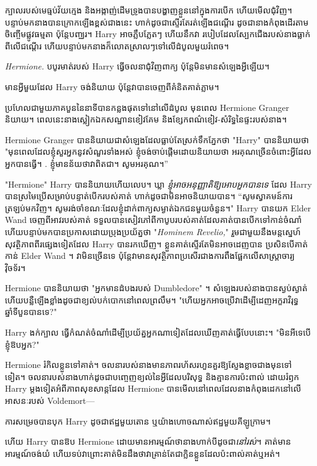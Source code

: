 ក្បាលរបស់មេធ្មប់វ័យក្មេង និងអង្កាញ់ដើមទ្រូងបានបង្ហាញខ្លួននៅក្នុងការបើក ហើយមើលជុំវិញ។ បន្ទាប់មកនាងបានក្រោកឡើងខ្ពស់ជាងនេះ ហាក់ដូចជាស្ទើរតែរត់ឡើងជណ្តើរ ដូចជានាងកំពុងដើរតាមចិញ្ចើមផ្លូវធម្មតា ប៉ុន្តែបញ្ឈរ។ Harry អាចភ្លឹបភ្លែតៗ ហើយនឹកវា របៀបដែលស្បែកជើងរបស់នាងធ្លាក់ពីលើជណ្ដើរ ហើយបន្ទាប់មកនាងក៏លោតស្រាលៗទៅលើដំបូលមួយរំពេច។

\emph{Hermione.} បបូរមាត់របស់ Harry ធ្វើចលនាជុំវិញពាក្យ ប៉ុន្តែមិនមានសំឡេងអ្វីឡើយ។

មាន​អ្វី​មួយ​ដែល Harry ចង់​និយាយ ប៉ុន្តែ​វា​បាន​ចេញ​ពី​គំនិត​គាត់​ភ្លាម។

ប្រហែលជាមួយភាគបួននៃនាទីបានកន្លងផុតទៅនៅលើដំបូល មុនពេល Hermione Granger និយាយ។ ពេលនេះនាងស្លៀកឯកសណ្ឋានខៀវគែម និងខ្សែកពណ៌ខៀវ-សំរិទ្ធនៃផ្ទះរបស់នាង។

Hermione Granger បាននិយាយជាសំឡេងដែលធ្លាប់តែស្រក់ទឹកភ្នែកថា "Harry" បាននិយាយថា "មុនពេលដែលខ្ញុំសួរអ្នកនូវសំណួរទាំងអស់ ខ្ញុំចង់ចាប់ផ្តើមដោយនិយាយថា អរគុណច្រើនចំពោះអ្វីដែលអ្នកបានធ្វើ។ . ខ្ញុំ​មាន​ន័យ​ថា​វា​ពិត​ជា​។ សូមអរគុណ។”

"Hermione" Harry បាននិយាយហើយលេប។ ឃ្លា \emph{ខ្ញុំអាចអនុញ្ញាតិឱ្យអោបអ្នកបានទេ} ដែល Harry បានស្រមៃប្រើសម្រាប់បន្ទាត់បើករបស់គាត់ ហាក់ដូចជាមិនអាចនិយាយបាន។ “សូមស្វាគមន៍ការត្រឡប់មកវិញ។ សូម​រង់ចាំ​ខណៈ​ដែល​ខ្ញុំ​ដាក់​ពាក្យ​សម្ងាត់​ឯកជន​មួយ​ចំនួន។" Harry បានយក Elder Wand ចេញពីអាវរបស់គាត់ ទទួលបានសៀវភៅពីកាបូបរបស់គាត់ដែលគាត់បានបើកទៅកាន់ចំណាំ ហើយបន្ទាប់មកបានប្រកាសដោយប្រុងប្រយ័ត្នថា "\emph{Hominem Revelio,}" រួមជាមួយនឹងមន្តស្នេហ៍សុវត្ថិភាពពីរផ្សេងទៀតដែល Harry បានរកឃើញ។ ខ្លួនគាត់ស្ទើរតែមិនអាចដេញបាន ប្រសិនបើគាត់កាន់ Elder Wand ។ វា​មិន​ច្រើន​ទេ ប៉ុន្តែ​វា​មាន​សុវត្ថិភាព​ប្រសើរ​ជាង​ការ​ពឹង​ផ្អែក​លើ​សាស្ត្រាចារ្យ​វ៉ិចទ័រ។

Hermione បាននិយាយថា "អ្នកមានដំបងរបស់ Dumbledore" ។ សំឡេង​របស់​នាង​បាន​ស្ងប់​ស្ងាត់ ហើយ​បន្លឺ​ឡើង​ខ្លាំង​ដូច​ជា​ខ្យល់​បក់​បោក​នៅ​ពេល​ព្រលឹម។ "ហើយអ្នកអាចប្រើវាដើម្បីដេញអក្ខរាវិរុទ្ធឆ្នាំទីបួនបានទេ?"

Harry ងក់ក្បាល ធ្វើ​កំណត់​ចំណាំ​ដើម្បី​ប្រយ័ត្ន​អ្នក​ណា​ទៀត​ដែល​ឃើញ​គាត់​ធ្វើ​បែប​នោះ។ "មិនអីទេបើខ្ញុំឱបអ្នក?"

Hermione រំកិលខ្លួនទៅគាត់។ ចលនា​របស់​នាង​មាន​ភាព​រហ័សរហួន​គួរ​ឱ្យ​ស្ញែង​ខ្លាច​ជាង​មុន​ទៅ​ទៀត។ ចលនារបស់នាងហាក់ដូចជាបញ្ចេញខ្យល់នៃអ្វីដែលបរិសុទ្ធ និងគ្មានការប៉ះពាល់ ដោយរំឭក Harry ម្ដងទៀតអំពីភាពសុខសាន្ដដែល Hermione បានមើលនៅពេលដែលនាងកំពុងដេកនៅលើអាសនៈរបស់ Voldemort—

ការសម្រេចបានបុក Harry ដូចជាឥដ្ឋមួយតោន ឬយ៉ាងហោចណាស់ឥដ្ឋមួយគីឡូក្រាម។

ហើយ Harry បានឱប Hermione ដោយមានអារម្មណ៍ថានាងហាក់បីដូចជា\emph{នៅរស់}។ គាត់​មាន​អារម្មណ៍​ចង់​យំ ហើយ​ទប់​វា​ព្រោះ​គាត់​មិន​ដឹង​ថា​វា​គ្រាន់​តែ​ជា​ក្លិន​ខ្លួន​ដែល​ប៉ះពាល់​គាត់​ឬ​អត់។

